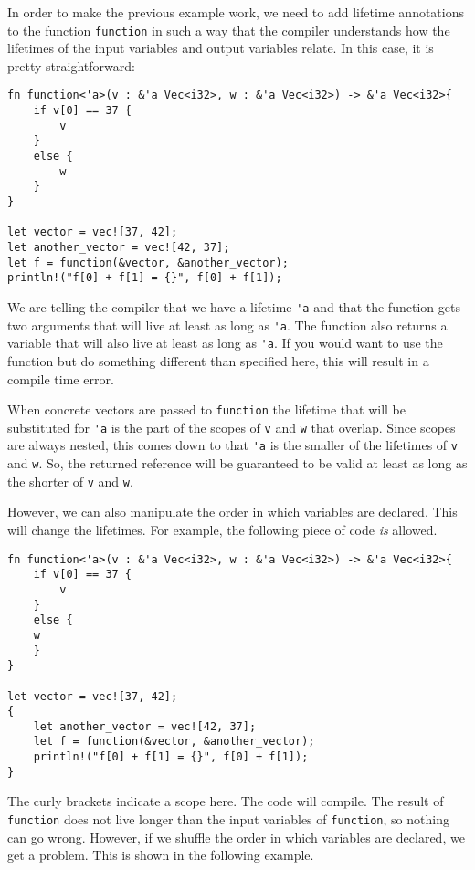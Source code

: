 In order to make the previous example work, we need to add lifetime annotations to the function \verb|function| in such a way that the compiler understands how the lifetimes of the input variables and output variables relate. In this case, it is pretty straightforward: 

\begin{verbatim}
fn function<'a>(v : &'a Vec<i32>, w : &'a Vec<i32>) -> &'a Vec<i32>{
    if v[0] == 37 {
        v
    }
    else {
        w
    }
}

let vector = vec![37, 42];
let another_vector = vec![42, 37];
let f = function(&vector, &another_vector);
println!("f[0] + f[1] = {}", f[0] + f[1]);
\end{verbatim}

We are telling the compiler that we have a lifetime \verb|'a| and that the function gets two arguments that will live at least as long as \verb|'a|. The function also returns a variable that will also live at least as long as \verb|'a|. If you would want to use the function but do something different than specified here, this will result in a compile time error. 

When concrete vectors are passed to \verb|function| the lifetime that will be substituted for \verb|'a| is the part of the scopes of \verb|v| and \verb|w| that overlap. Since scopes are always nested, this comes down to that \verb|'a| is the smaller of the lifetimes of \verb|v| and \verb|w|. So, the returned reference will be guaranteed to be valid at least as long as the shorter of \verb|v| and \verb|w|.

However, we can also manipulate the order in which variables are declared. This will change the lifetimes. 
For example, the following piece of code \emph{is} allowed.

\begin{verbatim}
fn function<'a>(v : &'a Vec<i32>, w : &'a Vec<i32>) -> &'a Vec<i32>{
    if v[0] == 37 {
        v
    }
    else {
    w
    }
}

let vector = vec![37, 42];
{
    let another_vector = vec![42, 37];
    let f = function(&vector, &another_vector);
    println!("f[0] + f[1] = {}", f[0] + f[1]);
}
\end{verbatim}
The curly brackets indicate a scope here. The code will compile. The result of \verb|function| does not live longer than the input variables of \verb|function|, so nothing can go wrong. However, if we shuffle the order in which variables are declared, we get a problem. This is shown in the following example.


